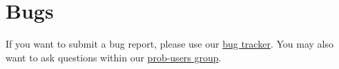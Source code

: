 \chapter{Bugs}
\label{bugs}

If you want to submit a bug report, please use our \href{http://jira.cobra.cs.uni-duesseldorf.de/}{bug tracker}. 
You may also want to ask questions within our \href{https://groups.google.com/d/forum/prob-users}{prob-users group}.
